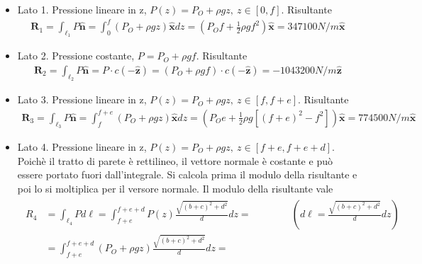 \documentclass[letterpaper,10pt,italian]{jupyterBook}
\begin{document}
\begin{itemize}
\item {} 
\sphinxAtStartPar
Lato 1. Pressione lineare in z,
\(P(z) = P_O + \rho g z , \ z \in [0,f]\). Risultante
\begin{equation*}
\begin{split}\mathbf{R}_1 = \int_{\ell_1} P \mathbf{\hat{n}} = \int_{0}^{f} (P_O + \rho g z) \mathbf{\hat{x}} dz = 
         \displaystyle\left(P_O  f + \frac{1}{2} \rho g f^2 \right) \mathbf{\hat{x}} = 347100 N/m \mathbf{\hat{x}}\end{split}
\end{equation*}
\item {} 
\sphinxAtStartPar
Lato 2. Pressione costante, \(P = P_O + \rho g f\). Risultante
\begin{equation*}
\begin{split}\mathbf{R}_2 = \int_{\ell_2} P \mathbf{\hat{n}} = P\cdot c (-\mathbf{\hat{z}})=(P_O + \rho g f)\cdot c(-\mathbf{\hat{z}}) = - 1043200 N/m \mathbf{\hat{z}}\end{split}
\end{equation*}
\item {} 
\sphinxAtStartPar
Lato 3. Pressione lineare in z,
\(P(z) = P_O + \rho g z , \  z \in [f,f+e]\). Risultante
\begin{equation*}
\begin{split}\mathbf{R}_3 = \int_{\ell_3} P \mathbf{\hat{n}} = \int_{f}^{f+e} (P_O + \rho g z) \mathbf{\hat{x}} dz = 
         \displaystyle\left(P_O e + \frac{1}{2} \rho g \left[(f+e)^2 - f^2\right]\right) \mathbf{\hat{x}} = 774500 N/m \mathbf{\hat{x}}\end{split}
\end{equation*}
\item {} 
\sphinxAtStartPar
Lato 4. Pressione lineare in z,
\(P(z)  = P_O + \rho g z , \ z \in [f+e,f+e+d]\). Poichè il tratto di
parete è rettilineo, il vettore normale è costante e può essere
portato fuori dall’integrale. Si calcola prima il modulo della
risultante e poi lo si moltiplica per il versore normale. Il modulo
della risultante vale
\begin{equation*}
\begin{split}\begin{aligned}
          {R}_4 & = \int_{\ell_4} P d\ell = \int_{f+e}^{f+e+d} P(z) \frac{\sqrt{(b+c)^2+d^2}}{d} dz = \qquad \qquad \text{$\displaystyle\left(d\ell = \frac{\sqrt{(b+c)^2+d^2}}{d} dz \right)$} \\
         & = \int_{f+e}^{f+e+d} (P_O + \rho g z) \frac{\sqrt{(b+c)^2+d^2}}{d} dz = \\

\end{aligned}
\end{split}
\end{equation*}
\end{itemize}
\end{document}
